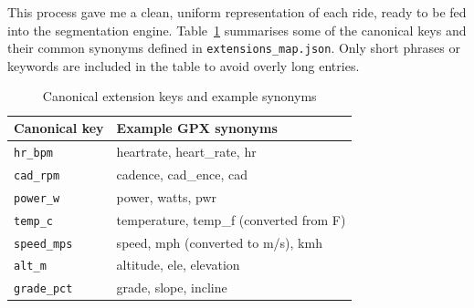 \documentclass[11pt,twoside]{report}
\begin{document}
This process gave me a clean, uniform representation of each ride, ready to be fed into the segmentation engine. Table~\ref{tab:extensionsmap} summarises some of the canonical keys and their common synonyms defined in \texttt{extensions\_map.json}. Only short phrases or keywords are included in the table to avoid overly long entries.
\begin{table}[H]
	\centering
	\caption{Canonical extension keys and example synonyms}
	\label{tab:extensionsmap}
	\begin{tabular}{ll}
		\toprule
		Canonical key       & Example GPX synonyms                                 \\
		\midrule
		\texttt{hr\_bpm}    & heartrate, heart\_rate, hr                           \\
		\texttt{cad\_rpm}   & cadence, cad\_ence, cad                              \\
		\texttt{power\_w}   & power, watts, pwr                                    \\
		\texttt{temp\_c}    & temperature, temp\_f (converted from \textdegree{}F) \\
		\texttt{speed\_mps} & speed, mph (converted to m/s), kmh                   \\
		\texttt{alt\_m}     & altitude, ele, elevation                             \\
		\texttt{grade\_pct} & grade, slope, incline                                \\
		\bottomrule
	\end{tabular}
\end{table}
\end{document}
